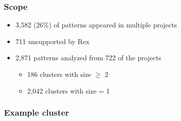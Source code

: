 
\begin{frame}
\frametitle{Scope}

\begin{itemize}
\item 3,582 (26\%) of patterns appeared in multiple projects 
\item 711 unsupported by Rex
\vspace{12pt}
\item<2-> 2,871 patterns analyzed from 722 of the projects
\begin{itemize}
\item<2->186 clusters with size $\geq$ 2
\item<2-> 2,042 clusters with size = 1
\end{itemize}
\end{itemize}

\end{frame}

\begin{frame}[fragile]
\frametitle{Example cluster}
\vspace{-24pt}


\end{frame}




